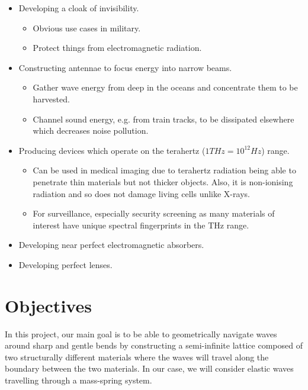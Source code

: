 \begin{itemize}
\item Developing a cloak of invisibility.\cite{emcloak}
      \begin{itemize}
      \item Obvious use cases in military.
      \item Protect things from electromagnetic radiation.
      \end{itemize}
\item Constructing antennae to focus energy into narrow beams.
      \cite{diremi,antennasol}
      \begin{itemize}
      \item Gather wave energy from deep in the oceans and concentrate them to
            be harvested.
      \item Channel sound energy, e.g. from train tracks, to be dissipated
            elsewhere which decreases noise pollution.
      \end{itemize}
\item Producing devices which operate on the terahertz ($1THz=10^{12}Hz$)
      range.\cite{THz}
      \begin{itemize}
      \item Can be used in medical imaging due to terahertz radiation being
            able to penetrate thin materials but not thicker objects. Also, it
            is non-ionising radiation and so does not damage living cells
            unlike X-rays.
      \item For surveillance, especially security screening as many materials
            of interest have unique spectral fingerprints in the THz
            range.\cite{Thzsec}
      \end{itemize}
\item Developing near perfect electromagnetic absorbers.\cite{absorbing}
\item Developing perfect lenses.\cite{negrefraclens}
\end{itemize}

\section{Objectives}
In this project, our main goal is to be able to geometrically navigate waves
around sharp and gentle bends by constructing a semi-infinite lattice composed
of two structurally different materials where the waves will travel along the
boundary between the two materials. In our case, we will consider elastic waves
travelling through a mass-spring system.

